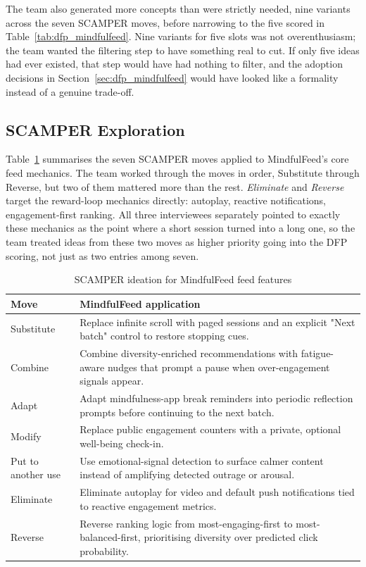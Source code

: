 \documentclass[11pt]{article}
\begin{document}
The team also generated more concepts than were strictly needed, nine variants across the seven SCAMPER moves, before narrowing to the five scored in Table~\ref{tab:dfp_mindfulfeed}. Nine variants for five slots was not overenthusiasm; the team wanted the filtering step to have something real to cut. If only five ideas had ever existed, that step would have had nothing to filter, and the adoption decisions in Section~\ref{sec:dfp_mindfulfeed} would have looked like a formality instead of a genuine trade-off.

\subsection{SCAMPER Exploration}
\label{sec:scamper_mindfulfeed}
Table~\ref{tab:scamper_mindfulfeed} summarises the seven SCAMPER moves applied to MindfulFeed's core feed mechanics. The team worked through the moves in order, Substitute through Reverse, but two of them mattered more than the rest. \textit{Eliminate} and \textit{Reverse} target the reward-loop mechanics directly: autoplay, reactive notifications, engagement-first ranking. All three interviewees separately pointed to exactly these mechanics as the point where a short session turned into a long one, so the team treated ideas from these two moves as higher priority going into the DFP scoring, not just as two entries among seven.

\begin{table}[h]
\centering
\caption{SCAMPER ideation for MindfulFeed feed features}
\label{tab:scamper_mindfulfeed}
\small
\begin{tabular}{p{2.8cm}p{11.5cm}}
\hline
\textbf{Move} & \textbf{MindfulFeed application} \\
\hline
Substitute & Replace infinite scroll with paged sessions and an explicit "Next batch" control to restore stopping cues. \\
Combine & Combine diversity-enriched recommendations with fatigue-aware nudges that prompt a pause when over-engagement signals appear. \\
Adapt & Adapt mindfulness-app break reminders into periodic reflection prompts before continuing to the next batch. \\
Modify & Replace public engagement counters with a private, optional well-being check-in. \\
Put to another use & Use emotional-signal detection to surface calmer content instead of amplifying detected outrage or arousal. \\
Eliminate & Eliminate autoplay for video and default push notifications tied to reactive engagement metrics. \\
Reverse & Reverse ranking logic from most-engaging-first to most-balanced-first, prioritising diversity over predicted click probability. \\
\hline
\end{tabular}
\end{table}
\end{document}
